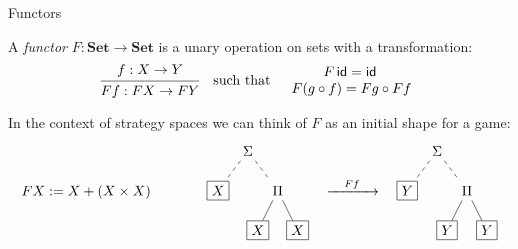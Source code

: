 \documentclass[aspectratio=1610,mathserif]{beamer}
\begin{document}
\begin{frame}[fragile]{Functors} %
  \begin{definition}
    A \emph{functor} $F : \mathbf{Set} \rightarrow \mathbf{Set}$
    is a unary operation on sets
    with a transformation:
    \[
      \begin{prooftree}
        \hypo{f : X \rightarrow Y}
        \infer1{F f : FX \rightarrow FY}
      \end{prooftree}
      \quad \text{such that} \quad
      \begin{array}{c}
        F \, \mathsf{id} = \mathsf{id} \: \\
        F (g \circ f) = Fg \circ Ff
      \end{array}
    \]
  \end{definition}
  \pause
  In the context of strategy spaces we can think of $F$
  as an initial shape for a game:
  \[
    FX := X + (X \times X)
    \qquad \qquad
    \begin{tikzpicture}
      [baseline=(B.base),
       level distance=1cm,
       level 1/.style={sibling distance=1.5cm,edge from parent/.style={draw,dashed}},
       level 2/.style={sibling distance=1cm,edge from parent/.style={draw,solid}}]
      \node {$\Sigma$}
        child { node[draw] (B) {$X$} }
        child {
          node {$\Pi$}
          child { node[draw,solid] {$X$} }
          child { node[draw,solid] {$X$} }
        };
    \end{tikzpicture}
    \quad
    \xrightarrow{\quad F f \quad}
    \quad
    \begin{tikzpicture}
      [baseline=(B.base),
       level distance=1cm,
       level 1/.style={sibling distance=1.5cm,edge from parent/.style={draw,dashed}},
       level 2/.style={sibling distance=1cm,edge from parent/.style={draw,solid}}]
      \node {$\Sigma$}
        child { node[draw] (B) {$Y$} }
        child {
          node {$\Pi$}
          child { node[draw,solid] {$Y$} }
          child { node[draw,solid] {$Y$} }
        };
    \end{tikzpicture}
  \]
\end{frame}
\end{document}
